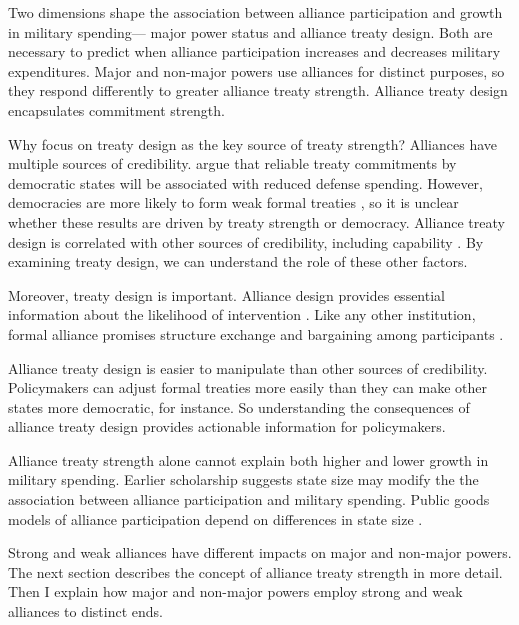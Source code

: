 \documentclass[12pt]{article}
\begin{document}
Two dimensions shape the association between alliance participation and growth in military spending--- major power status and alliance treaty design. 
Both are necessary to predict when alliance participation increases and decreases military expenditures. 
Major and non-major powers use alliances for distinct purposes, so they respond differently to greater alliance treaty strength. 
Alliance treaty design encapsulates commitment strength.


Why focus on treaty design as the key source of treaty strength? 
Alliances have multiple sources of credibility. 
\citet{DigiuseppePoast2016} argue that reliable treaty commitments by democratic states will be associated with reduced defense spending. 
However, democracies are more likely to form weak formal treaties \citep{Mattes2012}, so it is unclear whether these results are driven by treaty strength or democracy. 
Alliance treaty design is correlated with other sources of credibility, including capability \citep{Johnson2015}. 
By examining treaty design, we can understand the role of these other factors. 


Moreover, treaty design is important. 
Alliance design provides essential information about the likelihood of intervention \citep{Morrow2000, Leeds2003}. 
Like any other institution, formal alliance promises structure exchange and bargaining among participants \citep{Williamson1985, North1990, DiermeierKrehbiel2003}.


Alliance treaty design is easier to manipulate than other sources of credibility. 
Policymakers can adjust formal treaties more easily than they can make other states more democratic, for instance. 
So understanding the consequences of alliance treaty design provides actionable information for policymakers. 


Alliance treaty strength alone cannot explain both higher and lower growth in military spending. 
Earlier scholarship suggests state size may modify the the association between alliance participation and military spending. 
Public goods models of alliance participation depend on differences in state size \citep{OlsonZeckhauser1966, DudleyMontmarquette1981, Garfinkel2004}.  


Strong and weak alliances have different impacts on major and non-major powers.
The next section describes the concept of alliance treaty strength in more detail. 
Then I explain how major and non-major powers employ strong and weak alliances to distinct ends. 
\end{document}
